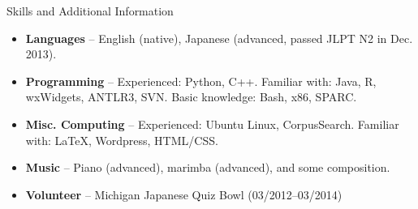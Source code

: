 \documentclass[10pt,oneside]{article}
\newenvironment{ressection}[1]{
	{\Large#1}
	\begin{itemize}
}{
	\end{itemize}
}
\begin{document}
\begin{ressection}{Skills and Additional Information}
	\item{\textbf{Languages} -- English (native), Japanese (advanced, passed JLPT N2 in Dec. 2013).}
    
    \item{\textbf{Programming} -- Experienced: Python, C++. Familiar with: Java, R, wxWidgets, ANTLR3, SVN. Basic knowledge: Bash, x86, SPARC.}
    
    \item{\textbf{Misc. Computing} -- Experienced: Ubuntu Linux, CorpusSearch. Familiar with: \LaTeX{}, Wordpress, HTML/CSS.}
    
    \item{\textbf{Music} --  Piano (advanced), marimba (advanced), and some composition.}
    
    \item{\textbf{Volunteer} -- Michigan Japanese Quiz Bowl (03/2012--03/2014)}
\end{ressection}
\end{document}
